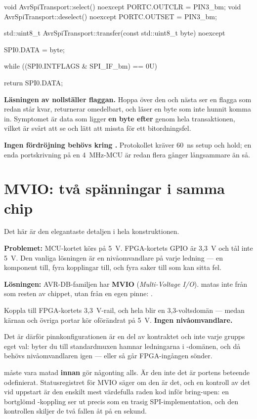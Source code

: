 \begin{cppcode}
void AvrSpiTransport::select() noexcept   { PORTC.OUTCLR = PIN3_bm; }
void AvrSpiTransport::deselect() noexcept { PORTC.OUTSET = PIN3_bm; }

std::uint8_t AvrSpiTransport::transfer(const std::uint8_t byte) noexcept
{
    SPI0.DATA = byte;

    while ((SPI0.INTFLAGS & SPI_IF_bm) == 0U)
    {
    }

    return SPI0.DATA;
}
\end{cppcode}

\textbf{Läsningen av  nollställer flaggan.} Hoppa över den och nästa
 ser en flagga som redan står kvar, returnerar omedelbart, och läser en byte som
inte hunnit komma in. Symptomet är data som ligger \textbf{en byte efter} genom hela
transaktionen, vilket är svårt att se och lätt att missta för ett bitordningsfel.

\textbf{Ingen fördröjning behövs kring .} Protokollet kräver 60~ns setup och hold; en
enda portskrivning på en 4~MHz-MCU är redan flera gånger långsammare än så.

\section{MVIO: två spänningar i samma chip}
\label{sec:mvio}

Det här är den elegantaste detaljen i hela konstruktionen.

\textbf{Problemet:} MCU-kortet körs på 5~V. FPGA-kortets GPIO är 3,3~V och tål inte 5~V. Den
vanliga lösningen är en nivåomvandlare på varje ledning --- en komponent till, fyra kopplingar
till, och fyra saker till som kan sitta fel.

\textbf{Lösningen:} AVR-DB-familjen har \textbf{MVIO} (\emph{Multi-Voltage I/O}). 
matas inte från  som resten av chippet, utan från en egen pinne: .

Koppla  till FPGA-kortets 3,3~V-rail, och hela  blir en
3,3-voltsdomän --- medan kärnan och övriga portar kör oförändrat på 5~V. \textbf{Ingen
nivåomvandlare.}

Det är därför pinnkonfigurationen är en del av kontraktet och inte varje grupps eget val: byter du
till standardmuxen hamnar ledningarna i -domänen, och då behövs nivåomvandlaren igen
--- eller så går FPGA-ingången sönder.

\begin{aside}
\note {} måste vara matad \textbf{innan}  gör någonting alls. Är den inte
det är portens beteende odefinierat. Statusregistret för MVIO säger om den är det, och en
kontroll av det vid uppstart är den enskilt mest värdefulla raden kod inför bring-upen: en
bortglömd -koppling ser ut precis som en trasig SPI-implementation, och den
kontrollen skiljer de två fallen åt på en sekund.
\end{aside}

